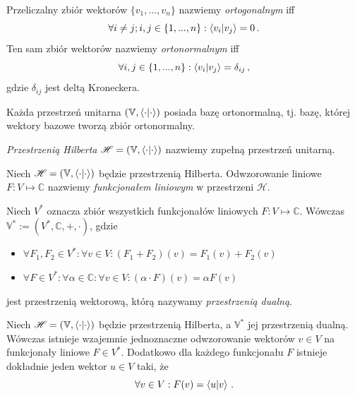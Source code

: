 \documentclass{myclass}
\begin{document}
\begin{definition}
Przeliczalny zbiór wektorów \(\{v_1,...,v_n\}\) nazwiemy \textit{ortogonalnym} iff 
\begin{equation*}
    \forall i\neq j; i,j\in\{1,...,n\} : \braket{v_i}{v_j} = 0\,.
\end{equation*}
Ten sam zbiór wektorów nazwiemy \textit{ortonormalnym} iff 
\begin{equation*}
    \forall i,j\in\{1,...,n\} : \braket{v_i}{v_j} = \delta_{ij}\,,
\end{equation*}
gdzie \(\delta_{ij}\) jest deltą Kroneckera.
\end{definition}

\begin{theorem}
Każda przestrzeń unitarna \((\mathbb{V}, \braket{\cdot})\) posiada bazę ortonormalną, tj. bazę,
której wektory bazowe tworzą zbiór ortonormalny.
\end{theorem}

\begin{definition}
\textit{Przestrzenią Hilberta} \(\mathscr{H}=(\mathbb{V},\braket{\cdot})\) nazwiemy zupełną
przestrzeń unitarną.
\end{definition}

\begin{definition}
Niech \(\mathscr{H} = (\mathbb{V},\braket{\cdot})\) będzie przestrzenią Hilberta. Odwzorowanie
liniowe \(F:V\mapsto\mathbb{C}\) nazwiemy \textit{funkcjonałem liniowym} w przestrzeni
\(\mathscr{H}\).
\end{definition}

\begin{theorem}
Niech \(V^*\) oznacza zbiór wszystkich funkcjonałów liniowych \(F:V\mapsto\mathbb{C}\). Wówczas
\(\mathbb{V}^*:=(V^*,\mathbb{C},+,\cdot)\), gdzie
\begin{itemize}
    \item \(\forall F_1,F_2 \in V^* : \forall v \in V : (F_1+F_2)(v) = F_1(v) + F_2(v)\)

    \item \(\forall F \in V^* : \forall \alpha \in \mathbb{C} : \forall v \in V : (\alpha \cdot
    F)(v) = \alpha F(v)\)
\end{itemize}
jest przestrzenią wektorową, którą nazywamy \textit{przestrzenią dualną}.
\end{theorem}

\begin{theorem}
Niech \(\mathscr{H}=(\mathbb{V},\braket{\cdot})\) będzie przestrzenią Hilberta, a \(\mathbb{V}^*\)
jej przestrzenią dualną. Wówczas istnieje wzajemnie jednoznaczne odwzorowanie wektorów \(v \in V\)
na funkcjonały liniowe \(F \in V^*\). Dodatkowo dla każdego funkcjonału \(F\) istnieje dokładnie
jeden wektor \(u \in V\) taki, że
\begin{equation*}
    \forall v \in V : F(v) = \braket{u}{v}\,.
\end{equation*}
\end{theorem}
\end{document}
